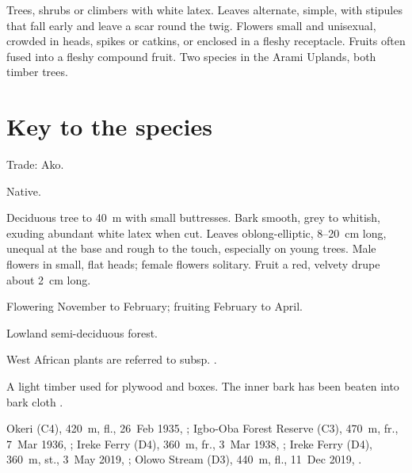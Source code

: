 \label{fam:moraceae}

Trees, shrubs or climbers with white latex. Leaves alternate, simple,
with stipules that fall early and leave a scar round the twig. Flowers
small and unisexual, crowded in heads, spikes or catkins, or enclosed
in a fleshy receptacle. Fruits often fused into a fleshy compound
fruit. Two species in the Arami Uplands, both timber trees.

\section*{Key to the species}
\begin{florakey}
\end{florakey}

\label{sp:MOR01}

 

 Trade: Ako.

 Native.

 Deciduous tree to 40~m with small buttresses. Bark
smooth, grey to whitish, exuding abundant white latex when cut. Leaves
oblong-elliptic, 8--20~cm long, unequal at the base and rough to the
touch, especially on young trees. Male flowers in small, flat heads;
female flowers solitary. Fruit a red, velvety drupe about 2~cm long.

 Flowering November to February; fruiting February
to April.

 Lowland semi-deciduous forest.

 West African plants are referred to
 subsp. 
.

 A light timber used for plywood and boxes. The inner bark
has been beaten into bark cloth \citep{hawthorne2006,louppe2008}.

 Okeri (C4), 420~m, fl., 26~Feb 1935, ;
Igbo-Oba Forest Reserve (C3), 470~m, fr., 7~Mar 1936, ;
Ireke Ferry (D4), 360~m, fr., 3~Mar 1938, ;
Ireke Ferry (D4), 360~m, st., 3~May 2019, ;
Olowo Stream (D3), 440~m, fl., 11~Dec 2019, .

